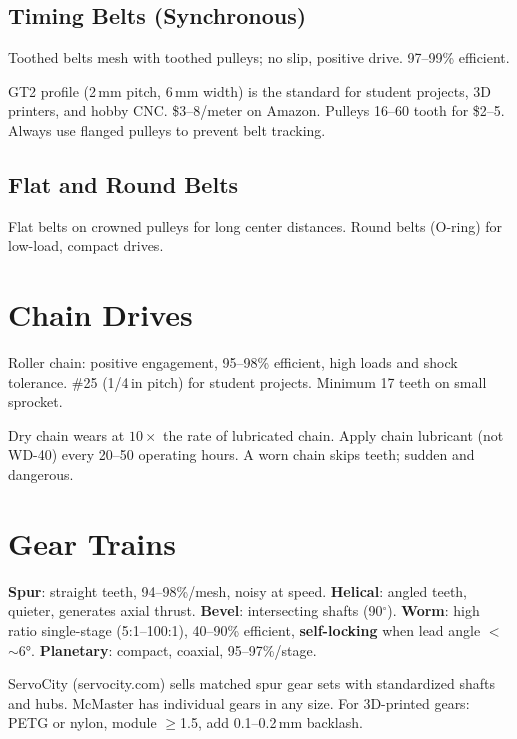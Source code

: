\subsection{Timing Belts (Synchronous)}
Toothed belts mesh with toothed pulleys; no slip, positive drive. 97--99\% efficient.

\begin{tipbox}
GT2 profile (2\,mm pitch, 6\,mm width) is the standard for student projects, 3D printers, and hobby CNC. \$3--8/meter on Amazon. Pulleys 16--60 tooth for \$2--5. Always use flanged pulleys to prevent belt tracking.
\end{tipbox}

\subsection{Flat and Round Belts}
Flat belts on crowned pulleys for long center distances. Round belts (O-ring) for low-load, compact drives.

\section{Chain Drives}
Roller chain: positive engagement, 95--98\% efficient, high loads and shock tolerance. \#25 (1/4\,in pitch) for student projects. Minimum 17 teeth on small sprocket.

\begin{tipbox}
Dry chain wears at $10\times$ the rate of lubricated chain. Apply chain lubricant (not WD-40) every 20--50 operating hours. A worn chain skips teeth; sudden and dangerous.
\end{tipbox}

\section{Gear Trains}



\textbf{Spur}: straight teeth, 94--98\%/mesh, noisy at speed. \textbf{Helical}: angled teeth, quieter, generates axial thrust. \textbf{Bevel}: intersecting shafts (90$^{\circ}$). \textbf{Worm}: high ratio single-stage (5:1--100:1), 40--90\% efficient, \textbf{self-locking} when lead angle $<$$\sim$\ang{6}. \textbf{Planetary}: compact, coaxial, 95--97\%/stage.

\begin{tipbox}
ServoCity (servocity.com) sells matched spur gear sets with standardized shafts and hubs. McMaster has individual gears in any size. For 3D-printed gears: PETG or nylon, module $\geq$1.5, add 0.1--0.2\,mm backlash.
\end{tipbox}


